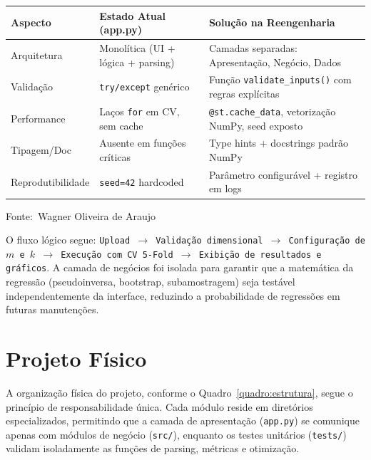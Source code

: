 \documentclass[12pt,a4paper]{article}
\newcommand{\oautor}{Wagner Oliveira de Araujo}
\begin{document}
\begin{quadro}[ht]
\centering
\small
\caption{Diagnóstico do código legado e arquitetura proposta}
\label{quadro:diagnostico}
\begin{threeparttable}
\begin{tabularx}{\textwidth}{|l|X|X|} \hline
\textbf{Aspecto} & \textbf{Estado Atual (app.py)} & \textbf{Solução na Reengenharia} \\ \hline
Arquitetura & Monolítica (UI + lógica + parsing) & Camadas separadas: Apresentação, Negócio, Dados \\ \hline
Validação & \texttt{try/except} genérico & Função \texttt{validate\_inputs()} com regras explícitas \\ \hline
Performance & Laços \texttt{for} em CV, sem cache & \texttt{@st.cache\_data}, vetorização NumPy, seed exposto \\ \hline
Tipagem/Doc & Ausente em funções críticas & Type hints + docstrings padrão NumPy \\ \hline
Reprodutibilidade & \texttt{seed=42} hardcoded & Parâmetro configurável + registro em logs \\ \hline
\end{tabularx}
\begin{tablenotes}[flushleft]
\footnotesize
\item Fonte:~\oautor
\end{tablenotes}
\end{threeparttable}
\end{quadro}

O fluxo lógico segue: \texttt{Upload $\rightarrow$ Validação dimensional $\rightarrow$ Configuração de $m$ e $k$ $\rightarrow$ Execução com CV 5-Fold $\rightarrow$ Exibição de resultados e gráficos}. A camada de negócios foi isolada para garantir que a matemática da regressão (pseudoinversa, bootstrap, subamostragem) seja testável independentemente da interface, reduzindo a probabilidade de regressões em futuras manutenções.

\newpage
\section{Projeto Físico}

A organização física do projeto, conforme o Quadro~\ref{quadro:estrutura}, segue o princípio de responsabilidade única. Cada módulo reside em diretórios especializados, permitindo que a camada de apresentação (\texttt{app.py}) se comunique apenas com módulos de negócio (\texttt{src/}), enquanto os testes unitários (\texttt{tests/}) validam isoladamente as funções de parsing, métricas e otimização.
\end{document}
